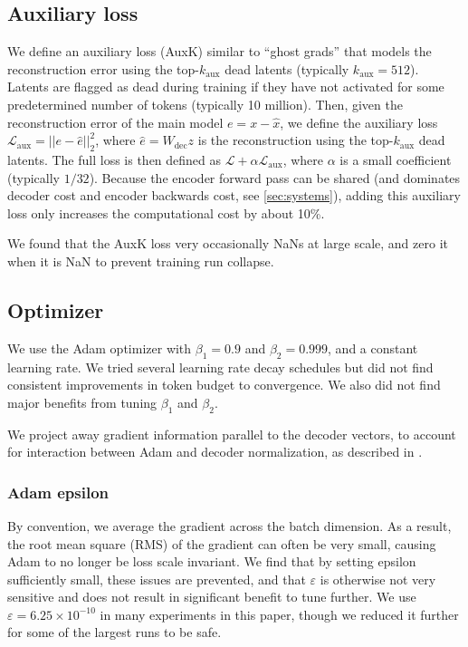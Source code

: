 \subsection{Auxiliary loss}
\label{sec:aux-loss}


We define an auxiliary loss (AuxK) similar to ``ghost grads'' \citep{jermyn2024ghost} that models the reconstruction error using the top-$k_{\text{aux}}$ dead latents (typically $k_{\text{aux}} = 512$). Latents are flagged as dead during training if they have not activated for some predetermined number of tokens (typically 10 million). Then, given the reconstruction error of the main model $e = x - \hat{x}$, we define the auxiliary loss $\mathcal{L}_\text{aux} = ||e - \hat{e}||^2_2$, where $\hat{e} = W_\text{dec} z$ is the reconstruction using the top-$k_{\text{aux}}$ dead latents.
The full loss is then defined as $\mathcal{L} + \alpha \mathcal{L}_\text{aux}$, where $\alpha$ is a small coefficient (typically $1/32$). 
Because the encoder forward pass can be shared (and dominates decoder cost and encoder backwards cost, see \autoref{sec:systems}), adding this auxiliary loss only increases the computational cost by about 10\%.

We found that the AuxK loss very occasionally NaNs at large scale, and zero it when it is NaN to prevent training run collapse.

\subsection{Optimizer}

We use the Adam optimizer \citep{kingma2014adam} with $\beta_1 = 0.9$ and $\beta_2 = 0.999$, and a constant learning rate.  We tried several learning rate decay schedules but did not find consistent improvements in token budget to convergence. We also did not find major benefits from tuning $\beta_1$ and $\beta_2$.

We project away gradient information parallel to the decoder vectors, to account for interaction between Adam and decoder normalization, as described in \citet{bricken2023monosemanticity}.

\subsubsection{Adam epsilon}

By convention, we average the gradient across the batch dimension. As a result, the root mean square (RMS) of the gradient can often be very small, causing Adam to no longer be loss scale invariant.%
We find that by setting epsilon sufficiently small, these issues are prevented, and that $\varepsilon$ is otherwise not very sensitive and does not result in significant benefit to tune further. We use $\varepsilon = 6.25 \times 10^{-10}$ in many experiments in this paper, though we reduced it further for some of the largest runs to be safe.%
